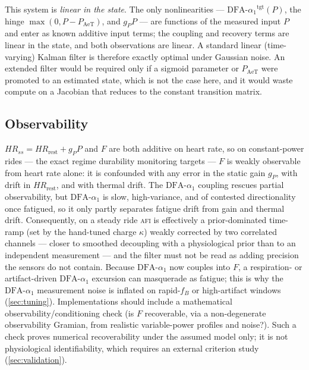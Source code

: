 \documentclass[11pt]{article}
\newcommand{\afi}{\textup{\textsc{afi}}}
\newcommand{\aone}{\ensuremath{\text{DFA-}\alpha_1}}
\newcommand{\Fstate}{\ensuremath{F}}
\begin{document}
This system is \emph{linear in the state}. The only nonlinearities --- $\aone^{\text{tgt}}(P)$, the hinge $\max(0,P-P_{\text{AeT}})$, and $g_P P$ --- are functions of the measured input $P$ and enter as known additive input terms; the coupling and recovery terms are linear in the state, and both observations are linear. A standard linear (time-varying) Kalman filter is therefore exactly optimal under Gaussian noise. An extended filter would be required only if a sigmoid parameter or $P_{\text{AeT}}$ were promoted to an estimated state, which is not the case here, and it would waste compute on a Jacobian that reduces to the constant transition matrix.

\subsection{Observability}\label{sec:observability}
$HR_{ss}=HR_{\text{rest}}+g_P P$ and $\Fstate$ are both additive on heart rate, so on constant-power rides --- the exact regime durability monitoring targets --- $\Fstate$ is weakly observable from heart rate alone: it is confounded with any error in the static gain $g_P$, with drift in $HR_{\text{rest}}$, and with thermal drift. The $\aone$ coupling rescues partial observability, but $\aone$ is slow, high-variance, and of contested directionality once fatigued, so it only partly separates fatigue drift from gain and thermal drift. Consequently, on a steady ride \afi{} is effectively a prior-dominated time-ramp (set by the hand-tuned charge $\kappa$) weakly corrected by two correlated channels --- closer to smoothed decoupling with a physiological prior than to an independent measurement --- and the filter must not be read as adding precision the sensors do not contain. Because $\aone$ now couples into $\Fstate$, a respiration- or artifact-driven $\aone$ excursion can masquerade as fatigue; this is why the $\aone$ measurement noise is inflated on rapid-$f_B$ or high-artifact windows (\autoref{sec:tuning}). Implementations should include a mathematical observability/conditioning check (is $\Fstate$ recoverable, via a non-degenerate observability Gramian, from realistic variable-power profiles and noise?). Such a check proves numerical recoverability under the assumed model only; it is not physiological identifiability, which requires an external criterion study (\autoref{sec:validation}).
\end{document}

